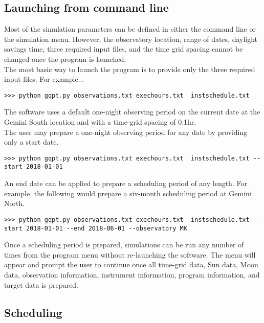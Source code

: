\documentclass{article}
\begin{document}
  
\subsection{Launching from command line}
\label{sec:launch}
Most of the simulation parameters can be defined in either the command line or the simulation menu.  However, the observatory location, range of dates, daylight savings time, three required input files, and the time grid spacing cannot be changed once the program is launched.\\

The most basic way to launch the program is to provide only the three required input files.  For example...
\begin{lstlisting}
>>> python gqpt.py observations.txt exechours.txt  instschedule.txt 
\end{lstlisting}

The software uses a default one-night observing period on the current date at the Gemini South location and with a time-grid spacing of 0.1hr.\\

The user may prepare a one-night observing period for any date by providing only a start date.
\begin{lstlisting}
>>> python gqpt.py observations.txt exechours.txt  instschedule.txt --start 2018-01-01
\end{lstlisting}

An end date can be applied to prepare a scheduling period of any length.  For example, the following would prepare a six-month scheduling period at Gemini North.
\begin{lstlisting}
>>> python gqpt.py observations.txt exechours.txt  instschedule.txt --start 2018-01-01 --end 2018-06-01 --observatory MK
\end{lstlisting}

Once a scheduling period is prepared, simulations can be run any number of times from the program menu without re-launching the software.  The menu will appear and prompt the user to continue once all time-grid data, Sun data, Moon data, observation information, instrument information, program information, and target data is prepared.

\subsection{Scheduling}
\label{sec:scheduling}
\end{document}
